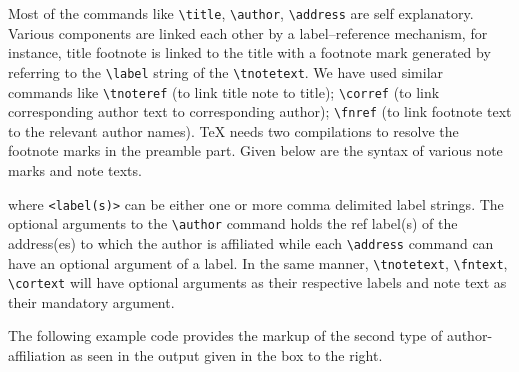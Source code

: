 \documentclass[a4paper,12pt]{article}
\begin{document}
Most of the commands like \verb+\title+, \verb+\author+,
\verb+\address+ are self explanatory.  Various components are
linked each other by a label--reference mechanism, for
instance, title footnote is linked to the title with a footnote
mark generated by referring to the \verb+\label+ string of
the \verb=\tnotetext=.  We have used similar commands
like \verb=\tnoteref= (to link title note to title);
\verb=\corref= (to link corresponding author text to
corresponding author); \verb=\fnref= (to link footnote text to
the relevant author names).  \TeX{} needs two compilations to
resolve the footnote marks in the preamble part.  Given below are
the syntax of various note marks and note texts.

\begin{vquote}
\end{vquote}

\noindent where \verb=<label(s)>= can be either one or more comma
delimited label strings. The optional arguments to the
\verb=\author= command holds the ref label(s) of the address(es)
to which the author is affiliated while each \verb=\address=
command can have an optional argument of a label. In the same
manner, \verb=\tnotetext=, \verb=\fntext=, \verb=\cortext= will
have optional arguments as their respective labels and note text
as their mandatory argument.

The following example code provides the markup of the second type
of author-affiliation as seen in the output given in the
box to the right.

\begin{vquote}
\author{C.V.~Radhakrishnan}
 \address{River Valley Technologies, SJP Building,
   Cotton Hills, Trivandrum, Kerala, India 695014}
\end{vquote}

\begin{vquote}
\author{K.~Bazargan}
 \address{River Valley Technologies, 9, Browns Court, Kennford,
   Exeter, UK.}
\end{vquote}

\begin{vquote}
\author{S.~Pepping}
 \address{Central Application Management,
   Elsevier, Radarweg 43, 1043 NX Amsterdam, Netherlands}
\end{vquote}
\end{document}
